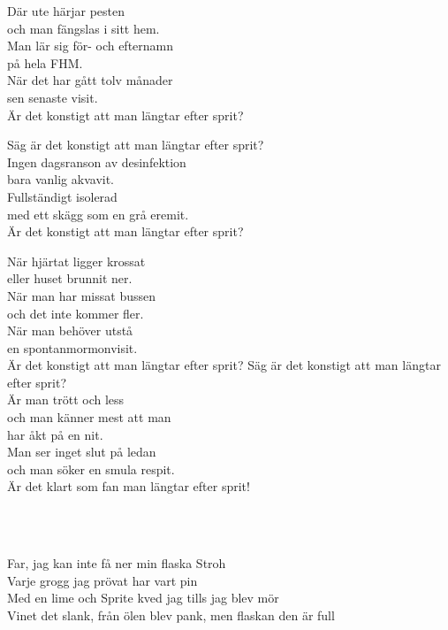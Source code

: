 Där ute härjar pesten \\
och man fängslas i sitt hem. \\
Man lär sig för- och efternamn \\
på hela FHM. \\
När det har gått tolv månader \\
sen senaste visit. \\
Är det konstigt att man längtar efter sprit?

Säg är det konstigt att man längtar efter sprit? \\
Ingen dagsranson av desinfektion \\
bara vanlig akvavit. \\
Fullständigt isolerad \\
med ett skägg som en grå eremit. \\
Är det konstigt att man längtar efter sprit?

När hjärtat ligger krossat \\
eller huset brunnit ner. \\
När man har missat bussen \\
och det inte kommer fler. \\
När man behöver utstå \\
en spontanmormonvisit. \\
Är det konstigt att man längtar efter sprit?
\newpage
Säg är det konstigt att man längtar efter sprit? \\
Är man trött och less \\
och man känner mest att man \\
har åkt på en nit. \\
Man ser inget slut på ledan \\
och man söker en smula respit. \\
Är det klart som fan man längtar efter sprit!

\\


 \\       
\author{Text: Lucifer}

\songtext{}Far, jag kan inte få ner min flaska Stroh\\
Varje grogg jag prövat har vart pin \\
Med en lime och Sprite kved jag tills jag blev mör \\
Vinet det slank, från ölen blev pank, men flaskan den är full 

